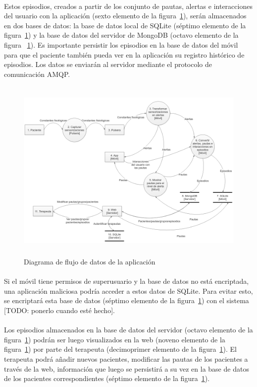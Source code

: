 \paragraph{}
Estos episodios, creados a partir de los conjunto de pautas, alertas e interacciones del usuario con la aplicación (sexto elemento de la figura~\ref{fig:c4:dfd}), serán almacenados en dos bases de datos: la base de datos local de SQLite (séptimo elemento de la figura~\ref{fig:c4:dfd}) y la base de datos del servidor de MongoDB (octavo elemento de la figura ~\ref{fig:c4:dfd}). Es importante persistir los episodios en la base de datos del móvil para que el paciente también pueda ver en la aplicación su registro histórico de episodios. Los datos se enviarán al servidor mediante el protocolo de comunicación AMQP.

\begin{figure}[H]
    \centering
    \includegraphics[height=9cm, width=\textwidth]{Imagenes/dfd-all.png}
    \caption[Diagrama de flujo de datos de la aplicación]{Diagrama de flujo de datos de la aplicación}
    \label{fig:c4:dfd}
\end{figure}

\paragraph{}
Si el móvil tiene permisos de superusuario y la base de datos no está encriptada, una aplicación maliciosa podría acceder a estos datos de SQLite. Para evitar esto, se encriptará esta base de datos (séptimo elemento de la figura~\ref{fig:c4:dfd}) con el sistema [TODO: ponerlo cuando esté hecho].

\paragraph{}
Los episodios almacenados en la base de datos del servidor (octavo elemento de la figura~\ref{fig:c4:dfd}) podrán ser luego visualizados en la web (noveno elemento de la figura~\ref{fig:c4:dfd}) por parte del terapeuta (decimoprimer elemento de la figura~\ref{fig:c4:dfd}). El terapeuta podrá añadir nuevos pacientes, modificar las pautas de los pacientes a través de la web, información que luego se persistirá a su vez en la base de datos de los pacientes correspondientes (séptimo elemento de la figura~\ref{fig:c4:dfd}).

